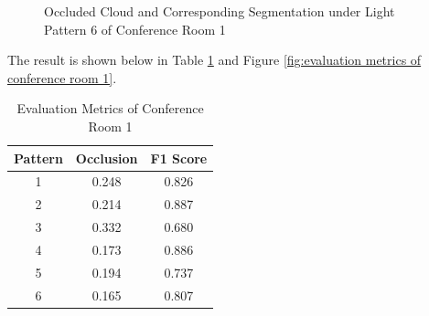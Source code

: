 \documentclass[11pt, a4paper,oneside,chapterprefix=false]{scrbook}
\begin{document}
\begin{figure}[H]
    \centering
      \label{fig:conf1 6 occluded} \hfill
     \label{fig:conf1 6 seg}
    \caption{Occluded Cloud and Corresponding Segmentation under Light Pattern 6 of Conference Room 1}
    \label{fig:conf1 6 occ and seg}
\end{figure}

The result is shown below in Table \ref{tab:evaluation metrics of conference room 1} and Figure \ref{fig:evaluation metrics of conference room 1}.

\begin{table}[H]
    \centering
    \begin{tabular}{|c|c|c|}
        \hline
        Pattern & Occlusion & F1 Score \\
        \hline
        1 & 0.248 & 0.826 \\
        2 & 0.214 & 0.887 \\
        3 & 0.332 & 0.680 \\
        4 & 0.173 & 0.886 \\
        5 & 0.194 & 0.737 \\
        6 & 0.165 & 0.807 \\
        \hline
    \end{tabular}
    \caption{Evaluation Metrics of Conference Room 1}
    \label{tab:evaluation metrics of conference room 1}
\end{table}
\end{document}

